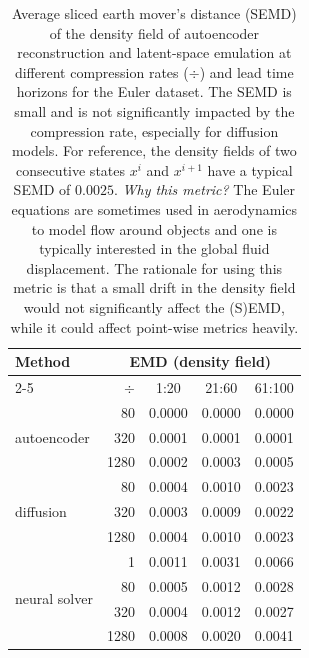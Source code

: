 \begin{subappendices}
\begin{table}[h]
    \centering
    \caption{Average sliced earth mover's distance (SEMD) \cite{bonneel2015sliced, kolouri2019generalized} of the density field of autoencoder reconstruction and latent-space emulation at different compression rates ($\div$) and lead time horizons for the Euler dataset. The SEMD is small and is not significantly impacted by the compression rate, especially for diffusion models. For reference, the density fields of two consecutive states $x^i$ and $x^{i+1}$ have a typical SEMD of $0.0025$. \emph{Why this metric?} The Euler equations are sometimes used in aerodynamics to model flow around objects and one is typically interested in the global fluid displacement. The rationale for using this metric is that a small drift in the density field would not significantly affect the (S)EMD, while it could affect point-wise metrics heavily.}
    \footnotesize
    \begin{tabular}{lrccc}
        \toprule
        \multirow[c]{2}{*}{Method} & \multicolumn{4}{c}{EMD (density field)} \\
        \cmidrule(lr){2-5}
        & $\div$ & 1:20 & 21:60 & 61:100 \\
        \midrule
        \multirow[c]{3}{*}{autoencoder}
        & 80 & 0.0000 & 0.0000 & 0.0000 \\
        & 320 & 0.0001 & 0.0001 & 0.0001 \\
        & 1280 & 0.0002 & 0.0003 & 0.0005 \\
        \midrule
        \multirow[c]{3}{*}{diffusion}
        & 80 & 0.0004 & 0.0010 & 0.0023 \\
        & 320 & 0.0003 & 0.0009 & 0.0022 \\
        & 1280 & 0.0004 & 0.0010 & 0.0023 \\
        \midrule
        \multirow[c]{4}{*}{neural solver}
        & 1 & 0.0011 & 0.0031 & 0.0066 \\
        & 80 & 0.0005 & 0.0012 & 0.0028 \\
        & 320 & 0.0004 & 0.0012 & 0.0027 \\
        & 1280 & 0.0008 & 0.0020 & 0.0041 \\
        \bottomrule
    \end{tabular}
    \label{tab:emd-euler-vs-compression}
\end{table}


\end{subappendices}
